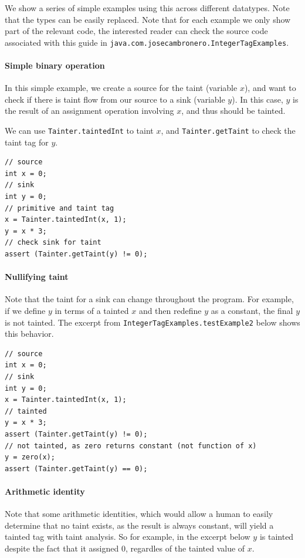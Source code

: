 \documentclass[a4paper]{article}
\begin{document}
We show a series of simple examples using this across different datatypes. Note that the types 
can be easily replaced. Note that for each example we only show part of the relevant code,
the interested reader can check the source code associated with this guide
in \verb|java.com.josecambronero.IntegerTagExamples|.

\paragraph{Simple binary operation}
In this simple example, we create a source for the taint (variable $x$), and want to check
if there is taint flow from our source to a sink (variable $y$). In this case, $y$ is the result
of an assignment operation involving $x$, and thus should be tainted.

We can use \verb|Tainter.taintedInt| to taint $x$, and \verb|Tainter.getTaint| to check the taint
tag for $y$.

\begin{lstlisting}
// source
int x = 0;
// sink
int y = 0;
// primitive and taint tag
x = Tainter.taintedInt(x, 1);
y = x * 3;
// check sink for taint
assert (Tainter.getTaint(y) != 0);
\end{lstlisting}



\paragraph{Nullifying taint}
Note that the taint for a sink can change throughout the program. For example,
if we define $y$ in terms of a tainted $x$ and then redefine $y$ as a constant, the final $y$
is not tainted. The excerpt from \verb|IntegerTagExamples.testExample2|  below
shows this behavior.

\begin{lstlisting}
// source
int x = 0;
// sink
int y = 0;
x = Tainter.taintedInt(x, 1);
// tainted
y = x * 3;
assert (Tainter.getTaint(y) != 0);
// not tainted, as zero returns constant (not function of x)
y = zero(x);
assert (Tainter.getTaint(y) == 0);
\end{lstlisting}


\paragraph{Arithmetic identity}
Note that some arithmetic identities, which would allow a human to easily determine that no
taint exists, as the result is always constant, will yield a tainted tag with taint analysis.
So for example, in the excerpt below $y$ is tainted despite the fact that it assigned 0, regardles
of the tainted value of $x$.
\end{document}
